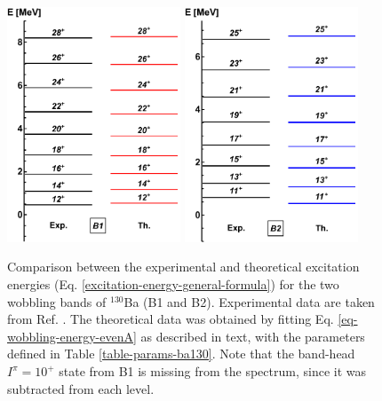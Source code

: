 \begin{figure}
    \centering
    \includegraphics[width=0.46\textwidth]{Chapters/Figures/ba130-band1.pdf}
    \includegraphics[width=0.46\textwidth]{Chapters/Figures/ba130-band2.pdf}
    \caption{Comparison between the experimental and theoretical excitation energies (Eq. \ref{excitation-energy-general-formula}) for the two wobbling bands of $^{130}$Ba (B1 and B2). Experimental data are taken from Ref. \cite{petrache2019diversity}. The theoretical data was obtained by fitting Eq. \ref{eq-wobbling-energy-evenA} as described in text, with the parameters defined in Table \ref{table-params-ba130}. Note that the band-head $I^\pi=10^+$ state from B1 is missing from the spectrum, since it was subtracted from each level.}
    \label{plot-ba130-excitation-energies}
\end{figure}

